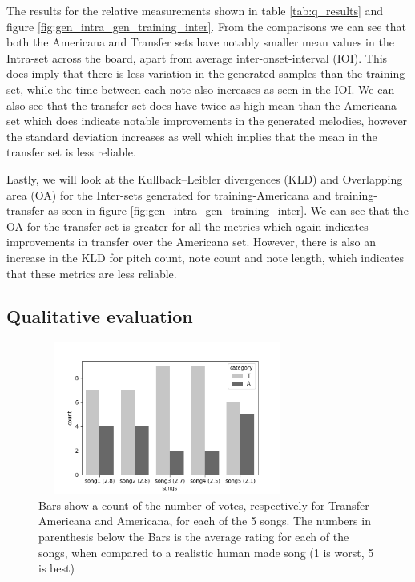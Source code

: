 \documentclass{IEEEtran}
\begin{document}
            The results for the relative measurements shown in table \ref{tab:q_results} and figure \ref{fig:gen_intra_gen_training_inter}. From the comparisons we can see that both the Americana and Transfer sets have notably smaller mean values in the Intra-set across the board, apart from average inter-onset-interval (IOI). This does imply that there is less variation in the generated samples than the training set, while the time between each note also increases as seen in the IOI. We can also see that the transfer set does have twice as high mean than the Americana set which does indicate notable improvements in the generated melodies, however the standard deviation increases as well which implies that the mean in the transfer set is less reliable.
            
            Lastly, we will look at the Kullback–Leibler divergences (KLD) and Overlapping area (OA) for the Inter-sets generated for training-Americana and training-transfer as seen in figure \ref{fig:gen_intra_gen_training_inter}. We can see that the OA for the transfer set is greater for all the metrics which again indicates improvements in transfer over the Americana set. However, there is also an increase in the KLD for pitch count, note count and note length, which indicates that these metrics are less reliable.
        

    \subsection{Qualitative evaluation}
    
        \begin{figure}
            \centering
            \includegraphics[width=8.5cm, height=5cm]{songs_category.png}
            \caption{Bars show a count of the number of votes, respectively for Transfer-Americana
             and Americana, for each of the 5 songs. The numbers in parenthesis below the Bars
             is the average rating for each of the songs, when compared to a realistic human made
             song (1 is worst, 5 is best)}
             \label{fig:songs}
        \end{figure} 
\end{document}
